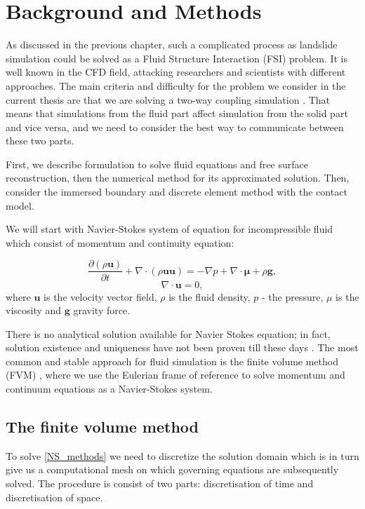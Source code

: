 \chapter{Background and Methods} \label{chap:lit_rev}

As discussed in the previous chapter, such a complicated process as landslide simulation could be solved as a Fluid Structure Interaction (FSI) problem. It is well known in the CFD field, attacking researchers and scientists with different approaches. The main criteria and difficulty for the problem we consider in the current thesis are that we are solving a two-way coupling simulation \cite{benra2011comparison}. That means that simulations from the fluid part affect simulation from the solid part and vice versa, and we need to consider the best way to communicate between these two parts.

First, we describe formulation to solve fluid equations and free surface reconstruction, then the numerical method for its approximated solution. Then, consider the immersed boundary and discrete element method with the contact model.

We will start with Navier-Stokes system of equation for incompressible fluid which consist of momentum and continuity equation:

\begin{equation}\label{NS_methods}
\frac{\partial(\rho \mathbf{u})}{\partial t}+\nabla \cdot(\rho \mathbf{u u})=-\nabla p+\nabla \cdot \boldsymbol{\mu}+\rho \mathbf{g},
\end{equation}
\begin{equation}
\nabla \cdot \mathbf{u}=0,
\end{equation}
where $\mathbf{u}$ is the velocity vector field, $\rho$ is the fluid density, $p$ - the pressure, $\mu$ is the viscosity and $\mathbf{g}$ gravity force.

There is no analytical solution available for Navier Stokes equation; in fact, solution existence and uniqueness have not been proven till these days \cite{klay}. The most common and stable approach for fluid simulation is the finite volume method (FVM) \cite{ferziger2002cfd}, where we use the Eulerian frame of reference to solve momentum and continuum equations as a Navier-Stokes system.

\section{The finite volume method}
To solve \ref{NS_methods} we need to discretize the solution domain which is in turn give us a computational mesh on which governing equations are subsequently solved. The procedure is consist of two parts: discretisation of time and discretisation of space.


